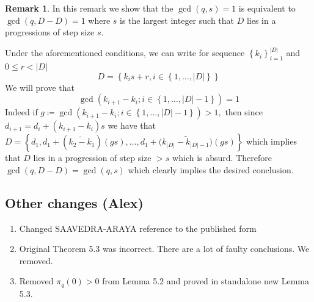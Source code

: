 \documentclass[12pt,leqno]{amsart}
\newcounter{counter}
\newcounter{counter2}
\numberwithin{equation}{section}
\numberwithin{counter2}{section}
\newcounter{theorem}
\theoremstyle{definition}
\newtheorem{remark}[subsection]{Remark}
\theoremstyle{plain}
\begin{document}
\begin{remark}
In this remark we show that the $\gcd(q,s)=1$ is equivalent to $\gcd(q,D-D)=1$ where $s$ is the largest integer such that $D$ lies in a progressions of step size $s.$ 

Under the aforementioned conditions, we can write for sequence $\left\{k_i \right\}_{i=1}^{|D|} $ and $0 \leq r<|D|$ \[ D= \left\{ k_{i}s+r, i \in \left\{1,\ldots,|D| \right\}   \right\} \] We will prove that \[ \gcd(k_{i+1}-k_{i}; i \in \left\{1,\ldots,|D|-1\right\})=1 \] Indeed if $ g \coloneqq \gcd(k_{i+1}-k_{i}; i \in \left\{1,\ldots,|D|-1\right\})>1,$ then since $d_{i+1}=d_i+(k_{i+1}-k_{i})s $ we have that $D= \left\{ d_1,d_1+(\widetilde{k_{2}-k_{1}})(gs), \ldots ,d_1+(\widetilde{k_{|D|}-k_{|D|-1})}(gs)  \right\} $ which implies that $D$ lies in a progression of step size $>s$ which is absurd. Therefore $\gcd(q,D-D)=\gcd(q,s)$ which clearly implies the desired conclusion.
\end{remark}

\subsection{Other changes (Alex)}
\begin{enumerate}
    \item Changed SAAVEDRA-ARAYA reference to the published form
    \item Original Theorem 5.3 was incorrect. There are a lot of faulty conclusions. We removed.
    \item Removed $\pi_q(0)>0$ from Lemma 5.2 and proved in standalone new Lemma 5.3.
\end{enumerate}
\end{document}
